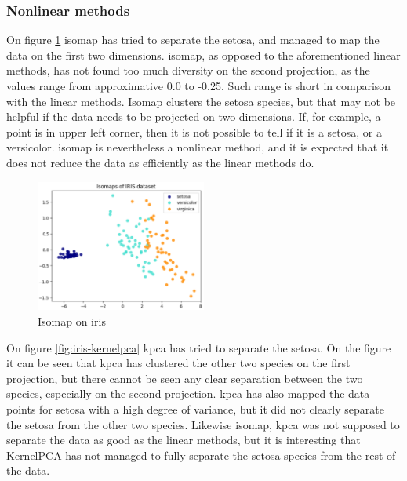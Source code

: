 \subsubsection{Nonlinear methods}\label{subsubsec:nonlinear-methods-on-iris}
On figure \ref{fig:iris-isomap} \gls{isomap} has tried to separate the setosa, and managed to map the data on the first two dimensions. \gls{isomap}, as opposed to the aforementioned linear methods, has not found too much diversity on the second projection, as the values range from approximative 0.0 to -0.25. Such range is short in comparison with the linear methods. Isomap clusters the setosa species, but that may not be helpful if the data needs to be projected on two dimensions. If, for example, a point is in upper left corner, then it is not possible to tell if it is a setosa, or a versicolor. \gls{isomap} is nevertheless a nonlinear method, and it is expected that it does not reduce the data as efficiently as the linear methods do.

\begin{figure}[h]
    \centering
    \includegraphics[width=0.5\textwidth]{figures/theory-example-figures/iris-isomap.png}
    \caption{Isomap on iris}
    \label{fig:iris-isomap}
    \end{figure}

On figure \ref{fig:iris-kernelpca} \gls{kpca} has tried to separate the setosa. On the figure it can be seen that \gls{kpca} has clustered the other two species on the first projection, but there cannot be seen any clear separation between the two species, especially on the second projection. \gls{kpca} has also mapped the data points for setosa with a high degree of variance, but it did not clearly separate the setosa from the other two species. Likewise \gls{isomap}, \gls{kpca} was not supposed to separate the data as good as the linear methods, but it is interesting that KernelPCA has not managed to fully separate the setosa species from the rest of the data.

